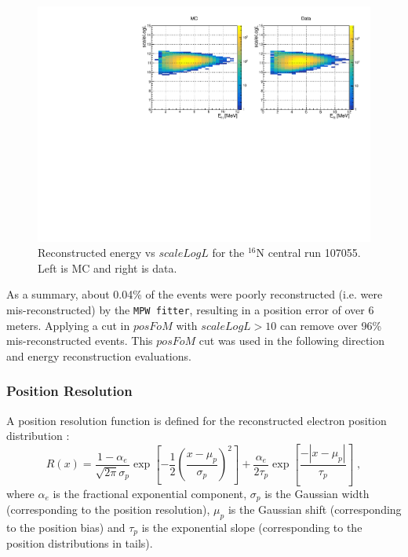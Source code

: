 \begin{figure}[!htb]
	\centering
	\includegraphics[width=13cm]{N16_107055_scaleLogLvsEnergy.pdf}
	\caption[Reconstructed energy vs $scaleLogL$ for the $^{16}$N central run 107055.]{Reconstructed energy vs $scaleLogL$ for the $^{16}$N central run 107055. Left is MC and right is data.\label{energyVsFOM}}
\end{figure}

As a summary, about 0.04\% of the events were poorly reconstructed (i.e. were mis-reconstructed) by the \texttt{MPW fitter}, resulting in a position error of over 6 meters. Applying a cut in $posFoM$ with $scaleLogL>10$ can remove over 96\% mis-reconstructed events. This $posFoM$ cut was used in the following direction and energy reconstruction evaluations.

\subsubsection{Position Resolution}\label{sect:positionResol}

A position resolution function is defined for the reconstructed electron position distribution \cite{boulay2004direct}:
\begin{equation}
R(x)=\frac{1-\alpha_e}{\sqrt{2\pi}\sigma_p}\exp{[-\frac{1}{2}(\frac{x-\mu_p}{\sigma_p})^2]+\frac{\alpha_e}{2\tau_p}\exp{[\frac{-|x-\mu_p|}{\tau_p}]}}\;,
\end{equation}
where $\alpha_e$ is the fractional exponential component, $\sigma_p$ is the Gaussian width (corresponding to the position resolution), $\mu_p$ is the Gaussian shift (corresponding to the position bias) and $\tau_p$ is the exponential slope (corresponding to the position distributions in tails).

